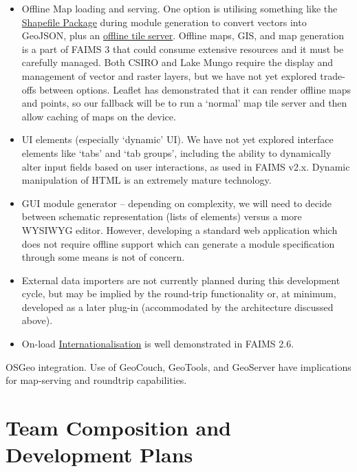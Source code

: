 \documentclass[a4paper,headings=small fontsize=10pt]{scrreprt}
\begin{document}
\begin{itemize}
\item Offline Map loading and serving. One option is utilising something
  like the \href{https://www.npmjs.com/package/shapefile}{{Shapefile
  Package}} during module generation to convert vectors into GeoJSON,
  plus an \href{https://www.npmjs.com/package/mapeo-server}{{offline
  tile server}}. Offline maps, GIS, and map generation is a part of
  FAIMS 3 that could consume extensive resources and it must be
  carefully managed. Both CSIRO and Lake Mungo require the display and
  management of vector and raster layers, but we have not yet explored
  trade-offs between options. Leaflet has demonstrated that it can
  render offline maps and points, so our fallback will be to run a
  `normal' map tile server and then allow caching of maps on the device.
 
\item UI elements (especially `dynamic' UI). We have not yet explored
  interface elements like `tabs' and `tab groups', including the ability
  to dynamically alter input fields based on user interactions, as used
  in FAIMS v2.x. Dynamic manipulation of HTML is an extremely mature
  technology.
 
\item GUI module generator -- depending on complexity, we will need to
  decide between schematic representation (lists of elements) versus a
  more WYSIWYG editor. However, developing a standard web application
  which does not require offline support which can generate a module
  specification through some means is not of concern.
 
\item External data importers are not currently planned during this
  development cycle, but may be implied by the round-trip functionality
  or, at minimum, developed as a later plug-in (accommodated by the
  architecture discussed above).
 
\item On-load \href{https://react.i18next.com/}{{Internationalisation}} is
  well demonstrated in FAIMS 2.6.
 
\end{itemize}

OSGeo integration. Use of GeoCouch, GeoTools, and GeoServer have
implications for map-serving and roundtrip capabilities.

\chapter{Team Composition and Development
Plans}
\end{document}
